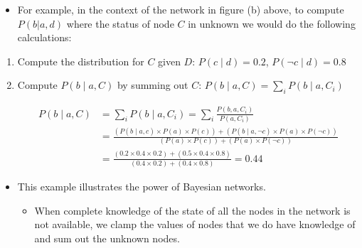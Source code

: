 \documentclass[xcolor={table}]{beamer}
\begin{document}
 \begin{frame} 
 \begin{itemize}
 	\item For example, in the context of the network in figure (b) above, to compute $P(b|a, d)$ where the status of node $C$ in unknown we would do the following calculations:
\end{itemize}
\begin{enumerate}
	\item Compute the distribution for $C$ given $D$: $P(c\mid d)=0.2$,  $P(\lnot c\mid d)=0.8$
	\item Compute $P(b\mid a,C)$ by summing out $C$: $P(b\mid a,C)=\sum_i P(b\mid a,C_i)$
\begin{footnotesize}
\begin{align*}
P(b\mid a, C) &= \sum_i P(b\mid a,C_i) =\sum_i \frac{P(b,a,C_i)}{P(a,C_i)}\\
&= \frac{(P(b\mid a,c) \times P(a) \times P(c))+(P(b\mid a,\lnot c) \times P(a) \times P(\lnot c))}{(P(a)\times P(c))+(P(a)\times P(\lnot c))}\\
&= \frac{(0.2 \times 0.4 \times 0.2)+ (0.5 \times 0.4 \times 0.8)}{(0.4\times0.2)+(0.4\times0.8)} = 0.44
\end{align*}
\end{footnotesize}
\end{enumerate}
\end{frame}

\begin{frame}
	\begin{itemize}
		\item  This example illustrates the power of Bayesian networks. 
		\begin{itemize}
			\item When complete knowledge of the state of all the nodes in the network is not available, we clamp the values of nodes that we do have knowledge of and sum out the unknown nodes. 
		\end{itemize}
	\end{itemize}
\end{frame} 
\end{document}
